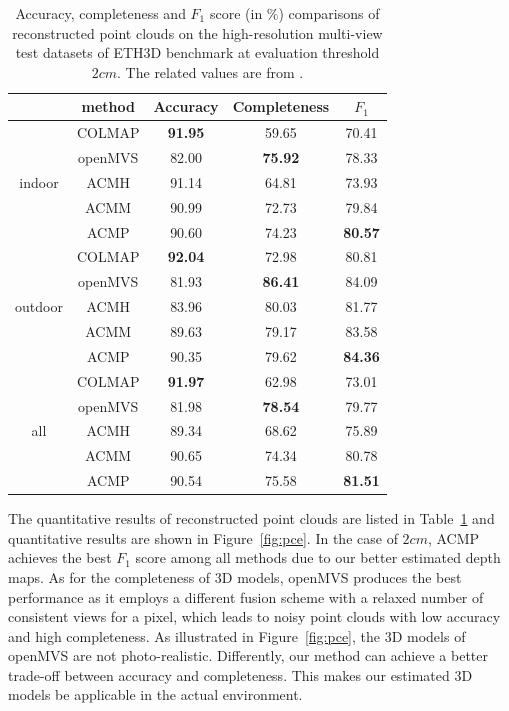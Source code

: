 \documentclass[letterpaper]{article} %
\begin{document}
\begin{table}[!htb]
	\caption{Accuracy, completeness and $F_{1}$ score (in $\%$) comparisons of reconstructed point clouds on the high-resolution multi-view test datasets of ETH3D benchmark at evaluation threshold $2cm$. The related values are from \cite{Schops2017ETH3D}.}
	\centering
	\footnotesize %
	\begin{tabular}{ccccc}
		\toprule
		& method & Accuracy & Completeness & $F_{1}$ \\
		\midrule
		\multirow{5}{*}{indoor} & COLMAP & {\bf 91.95} & 59.65 & 70.41 \\
		& openMVS & 82.00 & {\bf 75.92} & 78.33 \\
		& ACMH & 91.14 & 64.81 & 73.93 \\
		& ACMM & 90.99 & 72.73 & 79.84 \\
		& ACMP & 90.60 & 74.23 & {\bf 80.57} \\
		\midrule
		\multirow{5}{*}{outdoor} & COLMAP &  {\bf 92.04} & 72.98 & 80.81 \\
		& openMVS & 81.93 & {\bf 86.41} & 84.09 \\
		& ACMH & 83.96 & 80.03 & 81.77 \\
		& ACMM & 89.63 & 79.17 & 83.58 \\
		& ACMP & 90.35 & 79.62 & {\bf 84.36} \\
		\midrule
		\multirow{5}{*}{all} & COLMAP & {\bf 91.97} & 62.98 & 73.01 \\
		& openMVS & 81.98 & {\bf 78.54} & 79.77 \\
		& ACMH & 89.34 & 68.62 & 75.89 \\
		& ACMM & 90.65 & 74.34 & 80.78  \\
		& ACMP & 90.54 & 75.58 & {\bf 81.51} \\
		\bottomrule 
	\end{tabular}
\label{tab:pointcloud}
\end{table}

 The quantitative results of reconstructed point clouds are listed in Table~\ref{tab:pointcloud} and quantitative results are shown in Figure~\ref{fig:pce}. In the case of $2cm$, ACMP achieves the best $F_{1}$ score among all methods due to our better estimated depth maps. As for the completeness of 3D models, openMVS produces the best performance as it employs a different fusion scheme with a relaxed number of consistent views for a pixel, which leads to noisy point clouds with low accuracy and high completeness. As illustrated in Figure~\ref{fig:pce}, the 3D models of openMVS are not photo-realistic. Differently, our method can achieve a better trade-off between accuracy and completeness. This makes our estimated 3D models be applicable in the actual environment.
\end{document}
